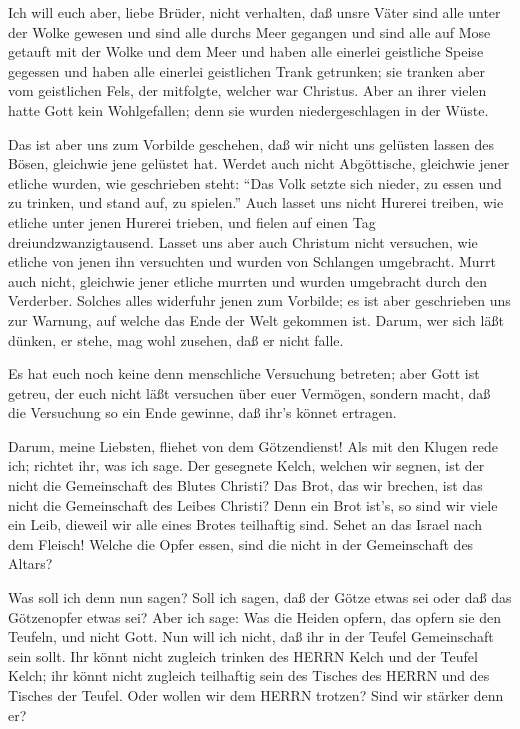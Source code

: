 Ich will euch aber, liebe Brüder, nicht verhalten, daß
unsre Väter sind alle unter der Wolke gewesen und sind alle durchs Meer
gegangen  und sind alle auf Mose getauft mit der Wolke und
dem Meer  und haben alle einerlei geistliche Speise gegessen
 und haben alle einerlei geistlichen Trank getrunken; sie
tranken aber vom geistlichen Fels, der mitfolgte, welcher war Christus.
 Aber an ihrer vielen hatte Gott kein Wohlgefallen; denn sie
wurden niedergeschlagen in der Wüste.

 Das ist aber uns zum Vorbilde geschehen, daß wir nicht uns
gelüsten lassen des Bösen, gleichwie jene gelüstet hat. 
Werdet auch nicht Abgöttische, gleichwie jener etliche wurden, wie
geschrieben steht: ``Das Volk setzte sich nieder, zu essen und zu
trinken, und stand auf, zu spielen.''  Auch lasset uns nicht
Hurerei treiben, wie etliche unter jenen Hurerei trieben, und fielen auf
einen Tag dreiundzwanzigtausend.  Lasset uns aber auch
Christum nicht versuchen, wie etliche von jenen ihn versuchten und
wurden von Schlangen umgebracht.  Murrt auch nicht,
gleichwie jener etliche murrten und wurden umgebracht durch den
Verderber.  Solches alles widerfuhr jenen zum Vorbilde; es
ist aber geschrieben uns zur Warnung, auf welche das Ende der Welt
gekommen ist.  Darum, wer sich läßt dünken, er stehe, mag
wohl zusehen, daß er nicht falle.

 Es hat euch noch keine denn menschliche Versuchung
betreten; aber Gott ist getreu, der euch nicht läßt versuchen über euer
Vermögen, sondern macht, daß die Versuchung so ein Ende gewinne, daß
ihr's könnet ertragen.

 Darum, meine Liebsten, fliehet von dem Götzendienst!
 Als mit den Klugen rede ich; richtet ihr, was ich sage.
 Der gesegnete Kelch, welchen wir segnen, ist der nicht die
Gemeinschaft des Blutes Christi? Das Brot, das wir brechen, ist das
nicht die Gemeinschaft des Leibes Christi?  Denn ein Brot
ist's, so sind wir viele ein Leib, dieweil wir alle eines Brotes
teilhaftig sind.  Sehet an das Israel nach dem Fleisch!
Welche die Opfer essen, sind die nicht in der Gemeinschaft des Altars?

 Was soll ich denn nun sagen? Soll ich sagen, daß der Götze
etwas sei oder daß das Götzenopfer etwas sei?  Aber ich
sage: Was die Heiden opfern, das opfern sie den Teufeln, und nicht Gott.
Nun will ich nicht, daß ihr in der Teufel Gemeinschaft sein sollt.
 Ihr könnt nicht zugleich trinken des HERRN Kelch und der
Teufel Kelch; ihr könnt nicht zugleich teilhaftig sein des Tisches des
HERRN und des Tisches der Teufel.  Oder wollen wir dem
HERRN trotzen? Sind wir stärker denn er?

